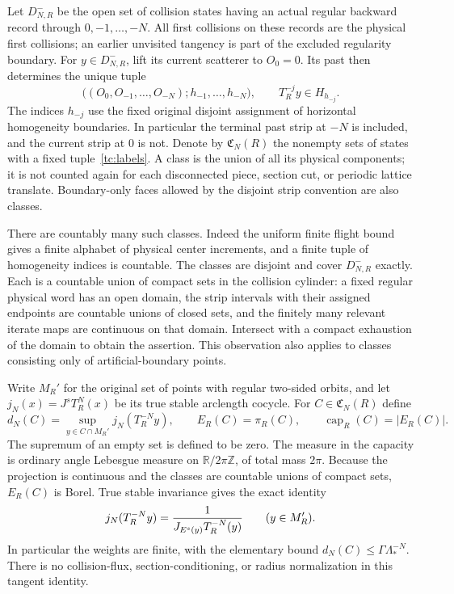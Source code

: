 Let $D^-_{N,R}$ be the open set of collision states having an
actual regular backward record through $0,-1,\ldots,-N$.
All first collisions on these records are the physical first
collisions; an earlier unvisited tangency is part of the excluded
regularity boundary.  For $y\in D^-_{N,R}$, lift its current
scatterer to $O_0=0$.  Its past then determines the unique tuple
\begin{equation}\label{tc:labels}
 \bigl((O_0,O_{-1},\ldots,O_{-N});
                    h_{-1},\ldots,h_{-N}\bigr),
 \qquad T_R^{-j}y\in H_{h_{-j}}.
\end{equation}
The indices $h_{-j}$ use the fixed original disjoint assignment
of horizontal homogeneity boundaries.  In particular the terminal
past strip at $-N$ is included, and the current strip at $0$ is not.
Denote by $\mathfrak C_N(R)$ the nonempty sets of states with a
fixed tuple~\eqref{tc:labels}.  A class is the union of all its
physical components; it is not counted again for each disconnected
piece, section cut, or periodic lattice translate.  Boundary-only
faces allowed by the disjoint strip convention are also classes.

There are countably many such classes.  Indeed the uniform finite
flight bound gives a finite alphabet of physical center increments,
and a finite tuple of homogeneity indices is countable.  The
classes are disjoint and cover $D^-_{N,R}$ exactly.  Each is a
countable union of compact sets in the collision cylinder: a fixed
regular physical word has an open domain, the strip intervals with
their assigned endpoints are countable unions of closed sets, and
the finitely many relevant iterate maps are continuous on that
domain.  Intersect with a compact exhaustion of the domain to
obtain the assertion.  This observation also applies to classes
consisting only of artificial-boundary points.

Write $M_R'$ for the original set of points with regular two-sided
orbits, and let $j_N(x)=J^sT_R^N(x)$ be its true stable arclength
cocycle.  For $C\in\mathfrak C_N(R)$ define
\begin{equation}\label{tc:weight-capacity}
 d_N(C)=\sup_{y\in C\cap M_R'}j_N(T_R^{-N}y),\qquad
 E_R(C)=\pi_R(C),\qquad
 \operatorname{cap}_R(C)=|E_R(C)|.
\end{equation}
The supremum of an empty set is defined to be zero.  The measure
in the capacity is ordinary angle Lebesgue measure on
$\mathbb R/2\pi\mathbb Z$, of total mass $2\pi$.  Because the
projection is continuous and the classes are countable unions of
compact sets, $E_R(C)$ is Borel.  True stable invariance gives the
exact identity
\begin{equation}\label{tc:inverse-identity}
 j_N(T_R^{-N}y)
    ={1\over J_{E^s(y)}T_R^{-N}(y)}\qquad(y\in M_R').
\end{equation}
In particular the weights are finite, with the elementary bound
$d_N(C)\le\Gamma\Lambda_*^{-N}$.  There is no collision-flux,
section-conditioning, or radius normalization in this tangent
identity.


